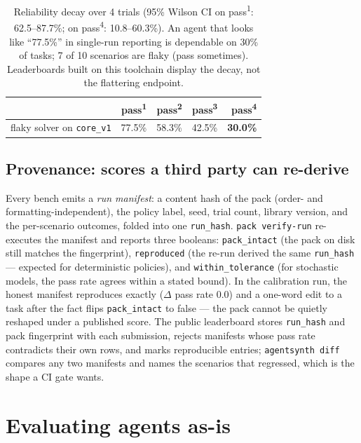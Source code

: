 \documentclass[11pt]{article}
\begin{document}
\begin{table}[t]
\centering
\begin{tabular}{lrrrr}
\toprule
 & pass\textsuperscript{1} & pass\textsuperscript{2} & pass\textsuperscript{3} & pass\textsuperscript{4} \\
\midrule
flaky solver on \texttt{core\_v1} & 77.5\% & 58.3\% & 42.5\% & \textbf{30.0\%} \\
\bottomrule
\end{tabular}
\caption{Reliability decay over 4 trials (95\% Wilson CI on
pass\textsuperscript{1}: 62.5--87.7\%; on pass\textsuperscript{4}:
10.8--60.3\%). An agent that looks like ``77.5\%'' in single-run reporting is
dependable on 30\% of tasks; 7 of 10 scenarios are flaky (pass sometimes).
Leaderboards built on this toolchain display the decay, not the flattering
endpoint.}
\label{tab:reliability}
\end{table}

\subsection{Provenance: scores a third party can re-derive}\label{sec:provenance}

Every bench emits a \emph{run manifest}: a content hash of the pack (order-
and formatting-independent), the policy label, seed, trial count, library
version, and the per-scenario outcomes, folded into one \texttt{run\_hash}.
\texttt{pack verify-run} re-executes the manifest and reports three booleans:
\texttt{pack\_intact} (the pack on disk still matches the fingerprint),
\texttt{reproduced} (the re-run derived the same \texttt{run\_hash} ---
expected for deterministic policies), and \texttt{within\_tolerance} (for
stochastic models, the pass rate agrees within a stated bound). In the
calibration run, the honest manifest reproduces exactly
($\Delta$ pass rate $0.0$) and a one-word edit to a task after the fact flips
\texttt{pack\_intact} to false --- the pack cannot be quietly reshaped under a
published score. The public leaderboard stores \texttt{run\_hash} and pack
fingerprint with each submission, rejects manifests whose pass rate
contradicts their own rows, and marks reproducible entries; \texttt{agentsynth
diff} compares any two manifests and names the scenarios that regressed,
which is the shape a CI gate wants.

\section{Evaluating agents as-is}\label{sec:interfaces}
\end{document}
